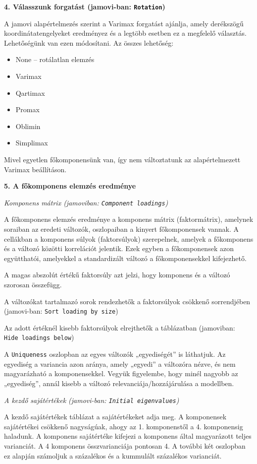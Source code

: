 \documentclass[
  letterpaper,
]{krantz}
\providecommand{\tightlist}{%
  \setlength{\itemsep}{0pt}\setlength{\parskip}{0pt}}\usepackage{longtable,booktabs,array}
\begin{document}
\textbf{4. Válasszunk forgatást (jamovi-ban: \texttt{Rotation})}

A jamovi alapértelmezés szerint a Varimax forgatást ajánlja, amely
derékszögű koordinátatengelyeket eredményez és a legtöbb esetben ez a
megfelelő választás. Lehetőségünk van ezen módosítani. Az összes
lehetőség:

\begin{itemize}
\tightlist
\item
  None -- rotálatlan elemzés
\item
  Varimax
\item
  Qartimax
\item
  Promax
\item
  Oblimin
\item
  Simplimax
\end{itemize}

Mivel egyetlen főkomponensünk van, így nem változtatunk az
alapértelmezett Varimax beállításon.

\textbf{5. A főkomponens elemzés eredménye}

\emph{Komponens mátrix (jamoviban: \texttt{Component\ loadings})}

A főkomponens elemzés eredménye a komponens mátrix (faktormátrix),
amelynek soraiban az eredeti változók, oszlopaiban a kinyert
főkomponensek vannak. A cellákban a komponens súlyok (faktorsúlyok)
szerepelnek, amelyek a főkomponens és a változó közötti korrelációt
jelentik. Ezek egyben a főkomponensek azon együtthatói, amelyekkel a
standardizált változó a főkomponensekkel kifejezhető.

A magas abszolút értékű faktorsúly azt jelzi, hogy komponens és a
változó szorosan összefügg.

A változókat tartalmazó sorok rendezhetők a faktorsúlyok csökkenő
sorrendjében (jamovi-ban: \texttt{Sort\ loading\ by\ size})

Az adott értéknél kisebb faktorsúlyok elrejthetők a táblázatban
(jamoviban: \texttt{Hide\ loadings\ below})

A \texttt{Uniqueness} oszlopban az egyes változók „egyediségét'' is
láthatjuk. Az egyediség a variancia azon aránya, amely „egyedi'' a
változóra nézve, és nem magyarázható a komponensekkel. Vegyük
figyelembe, hogy minél nagyobb az „egyediség'', annál kisebb a változó
relevanciája/hozzájárulása a modellben.

\emph{A kezdő sajátértékek (jamovi-ban: \texttt{Initial\ eigenvalues})}

A kezdő sajátértékek táblázat a sajátértékeket adja meg. A komponensek
sajátértékei csökkenő nagyságúak, ahogy az 1. komponenstől a 4.
komponensig haladunk. A komponens sajátértéke kifejezi a komponens által
magyarázott teljes varianciát. A 4 komponens összvarianciája pontosan 4.
A további két oszlopban ez alapján számoljuk a százalékos és a kummulált
százalékos varianciát.
\end{document}
